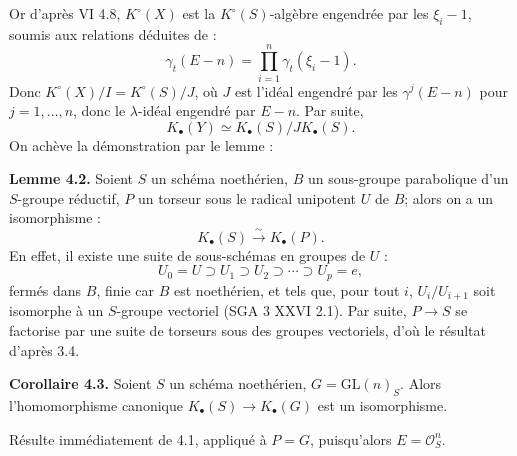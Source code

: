 Or d'après VI 4.8, $K^\circ(X)$ est la $K^\circ(S)$-algèbre
engendrée par les $\xi_i-1$, soumis aux relations déduites de :
\[
\gamma_t(E-n)=\prod_{i=1}^n\gamma_t(\xi_i-1).
\]
Donc $K^\circ(X)/I=K^\circ(S)/J$, où $J$ est l'idéal engendré par les $\gamma^j(E-n)$ pour $j=1,\ldots,n$, donc le $\lambda$-idéal engendré par $E-n$. Par suite,
\[
K_\bullet(Y)\simeq K_\bullet(S)/J K_\bullet(S).
\]
On achève la démonstration par le lemme :

\textbf{Lemme 4.2.} Soient $S$ un schéma noethérien, $B$ un sous-groupe parabolique d'un $S$-groupe réductif, $P$ un torseur sous le radical unipotent $U$ de $B$; alors on a un isomorphisme :
\[
K_\bullet(S)\xrightarrow{\sim}K_\bullet(P).
\]
En effet, il existe une suite de sous-schémas en groupes de $U$ :
\[
U_0=U\supset U_1\supset U_2\supset\cdots\supset U_p=e,
\]
fermés dans $B$, finie car $B$ est noethérien, et tels que, pour tout $i$, $U_i/U_{i+1}$ soit isomorphe à un $S$-groupe vectoriel (SGA 3 XXVI 2.1). Par suite, $P\to S$ se factorise par une suite de torseurs sous des groupes vectoriels, d'où le résultat d'après 3.4.

\textbf{Corollaire 4.3.} Soient $S$ un schéma noethérien, $G=\mathrm{GL}(n)_S$. Alors l'homomorphisme canonique $K_\bullet(S)\longrightarrow K_\bullet(G)$ est un isomorphisme.

Résulte immédiatement de 4.1, appliqué à $P=G$, puisqu'alors $E=\mathcal O_S^n$.

